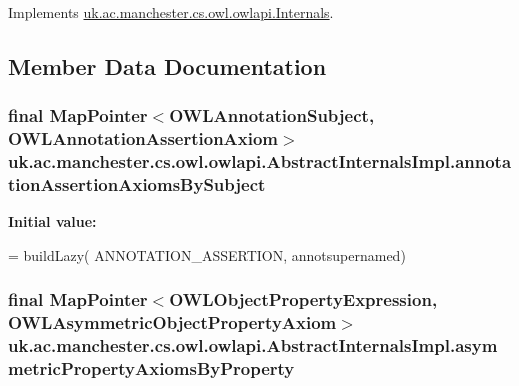 Implements \hyperlink{interfaceuk_1_1ac_1_1manchester_1_1cs_1_1owl_1_1owlapi_1_1_internals_a61da8a81982d8f9df698a406177a140a}{uk.\-ac.\-manchester.\-cs.\-owl.\-owlapi.\-Internals}.



\subsection{Member Data Documentation}
\hypertarget{classuk_1_1ac_1_1manchester_1_1cs_1_1owl_1_1owlapi_1_1_abstract_internals_impl_a8b51e08aacb5e75c9639e70aec3355dd}{
\subsubsection[{annotation\-Assertion\-Axioms\-By\-Subject}]{\setlength{\rightskip}{0pt plus 5cm}final Map\-Pointer$<${\bf O\-W\-L\-Annotation\-Subject}, {\bf O\-W\-L\-Annotation\-Assertion\-Axiom}$>$ uk.\-ac.\-manchester.\-cs.\-owl.\-owlapi.\-Abstract\-Internals\-Impl.\-annotation\-Assertion\-Axioms\-By\-Subject\hspace{0.3cm}{\ttfamily [protected]}}}\label{classuk_1_1ac_1_1manchester_1_1cs_1_1owl_1_1owlapi_1_1_abstract_internals_impl_a8b51e08aacb5e75c9639e70aec3355dd}
{\bfseries Initial value\-:}
\begin{DoxyCode}
= buildLazy(
            ANNOTATION\_ASSERTION, annotsupernamed)
\end{DoxyCode}
\hypertarget{classuk_1_1ac_1_1manchester_1_1cs_1_1owl_1_1owlapi_1_1_abstract_internals_impl_ac37a3bedd042163b7af06c2de2da11f0}{
\subsubsection[{asymmetric\-Property\-Axioms\-By\-Property}]{\setlength{\rightskip}{0pt plus 5cm}final Map\-Pointer$<${\bf O\-W\-L\-Object\-Property\-Expression}, {\bf O\-W\-L\-Asymmetric\-Object\-Property\-Axiom}$>$ uk.\-ac.\-manchester.\-cs.\-owl.\-owlapi.\-Abstract\-Internals\-Impl.\-asymmetric\-Property\-Axioms\-By\-Property\hspace{0.3cm}{\ttfamily [protected]}}}\label{classuk_1_1ac_1_1manchester_1_1cs_1_1owl_1_1owlapi_1_1_abstract_internals_impl_ac37a3bedd042163b7af06c2de2da11f0}
